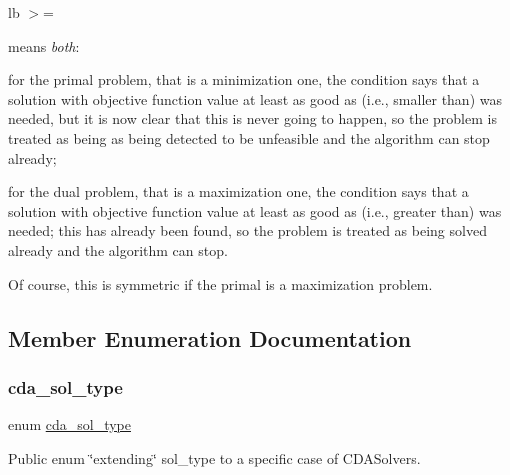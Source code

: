 lb $>$= 

means {\itshape both}\+:


\begin{DoxyItemize}
\item for the primal problem, that is a minimization one, the condition says that a solution with objective function value at least as good as (i.\+e., smaller than)  was needed, but it is now clear that this is never going to happen, so the problem is treated as being as being detected to be unfeasible and the algorithm can stop already;
\item for the dual problem, that is a maximization one, the condition says that a solution with objective function value at least as good as (i.\+e., greater than)  was needed; this has already been found, so the problem is treated as being solved already and the algorithm can stop.
\end{DoxyItemize}

Of course, this is symmetric if the primal is a maximization problem. 

\subsection{Member Enumeration Documentation}
\mbox{\label{class_s_m_spp__di__unipi__it_1_1_c_d_a_solver_a5c019517747a79f60866b19ce82194bf}} 
\subsubsection{\texorpdfstring{cda\+\_\+sol\+\_\+type}{cda\_sol\_type}}
{\footnotesize\ttfamily enum \mbox{\hyperlink{class_s_m_spp__di__unipi__it_1_1_c_d_a_solver_a5c019517747a79f60866b19ce82194bf}{cda\+\_\+sol\+\_\+type}}}



Public enum \char`\"{}extending\char`\"{} sol\+\_\+type to a specific case of C\+D\+A\+Solvers. 

